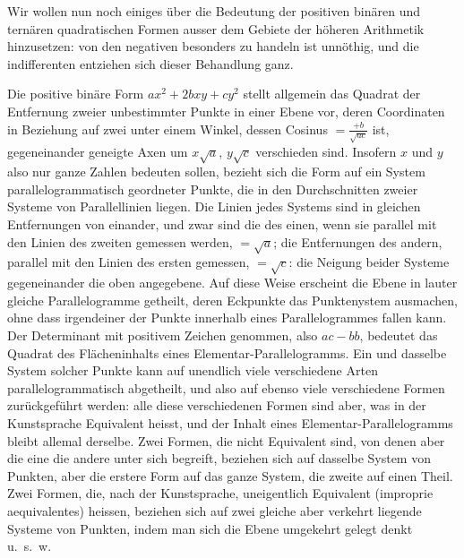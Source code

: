 \documentclass[12pt,a4paper]{article}
\begin{document}
Wir wollen nun noch einiges \"{u}ber die Bedeutung der positiven bin\"{a}ren und tern\"{a}ren quadratischen Formen ausser dem Gebiete der h\"{o}heren Arithmetik hinzusetzen: von den negativen besonders zu handeln ist unn\"{o}thig, und die indifferenten entziehen sich dieser Behandlung ganz.

Die positive bin\"{a}re Form $ax^2+2bxy+cy^2$ stellt allgemein das Quadrat der Entfernung zweier unbestimmter Punkte in einer Ebene vor, deren Coordinaten in Beziehung auf zwei unter einem Winkel, dessen Cosinus $=\frac{+b}{\sqrt{ac}}$ ist, gegeneinander geneigte Axen um $x\sqrt{a}$, $y\sqrt{c}$ verschieden sind. Insofern $x$ und $y$ also nur ganze Zahlen bedeuten sollen, bezieht sich die Form auf ein System parallelogrammatisch geordneter Punkte, die in den Durchschnitten zweier Systeme von Parallellinien liegen. Die Linien jedes Systems sind in gleichen Entfernungen von einander, und zwar sind die des einen, wenn sie parallel mit den Linien des zweiten gemessen werden, $=\sqrt{a}$; die Entfernungen des andern, parallel mit den Linien des ersten gemessen, $=\sqrt{c}$: die Neigung beider Systeme gegeneinander die oben angegebene. Auf diese Weise erscheint die Ebene in lauter gleiche Parallelogramme getheilt, deren Eckpunkte das Punktenystem ausmachen, ohne dass irgendeiner der Punkte innerhalb eines Parallelogrammes fallen kann. Der Determinant mit positivem Zeichen genommen, also $ac-bb$, bedeutet das Quadrat des Fl\"{a}cheninhalts eines Elementar-Parallelogramms. Ein und dasselbe System solcher Punkte kann auf unendlich viele verschiedene Arten parallelogrammatisch abgetheilt, und also auf ebenso viele verschiedene Formen zur\"{u}ckgef\"{u}hrt werden: alle diese verschiedenen Formen sind aber, was in der Kunstsprache Equivalent heisst, und der Inhalt eines Elementar-Parallelogramms bleibt allemal derselbe. Zwei Formen, die nicht Equivalent sind, von denen aber die eine die andere unter sich begreift, beziehen sich auf dasselbe System von Punkten, aber die erstere Form auf das ganze System, die zweite auf einen Theil. Zwei Formen, die, nach der Kunstsprache, uneigentlich Equivalent (improprie aequivalentes) heissen, beziehen sich auf zwei gleiche aber verkehrt liegende Systeme von Punkten, indem man sich die Ebene umgekehrt gelegt denkt u.~s.~w.
\end{document}
